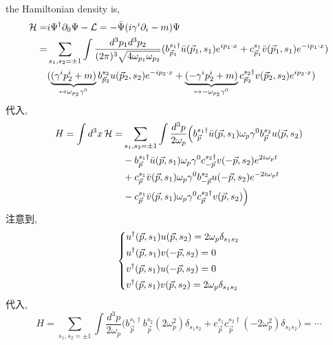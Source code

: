 \begin{itemize}
	\begin{tcolorbox}[title=calculation:]
		the Hamiltonian density is,
		\begin{align}
			\mathcal{H} =& i \Psi^\dag \partial_0 \Psi - \mathcal{L} = - \bar{\Psi} (i \gamma^i \partial_i - m) \Psi \notag \\
			=& \sum_{s_1, s_2 = \pm 1} \int \frac{d^3 p_1 d^3 p_2}{(2 \pi)^3 \sqrt{4 \omega_{p_1} \omega_{p_2}}} (b^{s_1 \dag}_{\vec{p}_1} \bar{u}(\vec{p}_1, s_1) e^{i p_1 \cdot x} + c^{s_1}_{\vec{p}_1} \bar{v}(\vec{p}_1, s_1) e^{- i p_1 \cdot x}) \notag \\
			& (\underbrace{(\gamma^i p_2^i + m)}_{\mapsto \omega_{p_2} \gamma^0} b^{s_2}_{\vec{p}_2} u(\vec{p}_2, s_2) e^{- i p_2 \cdot x} + \underbrace{(- \gamma^i p_2^i + m)}_{\mapsto - \omega_{p_2} \gamma^0} c^{s_2 \dag}_{\vec{p}_2} v(\vec{p}_2, s_2) e^{i p_2 \cdot x})
		\end{align}
		代入,
		\begin{align}
			H = \int d^3 x \, \mathcal{H} =& \sum_{s_1, s_2 = \pm 1} \int \frac{d^3 p}{2 \omega_p} \Big( b^{s_1 \dag}_{\vec{p}} \bar{u}(\vec{p}, s_1) \omega_p \gamma^0 b^{s_2}_{\vec{p}} u(\vec{p}, s_2) \notag \\
			& - b^{s_1 \dag}_{\vec{p}} \bar{u}(\vec{p}, s_1) \omega_p \gamma^0 c^{s_2 \dag}_{- \vec{p}} v(- \vec{p}, s_2) e^{2 i \omega_p t} \notag \\
			& + c^{s_1}_{\vec{p}} \bar{v}(\vec{p}, s_1) \omega_p \gamma^0 b^{s_2}_{- \vec{p}} u(- \vec{p}, s_2) e^{- 2 i \omega_p t} \notag \\
			& - c^{s_1}_{\vec{p}} \bar{v}(\vec{p}, s_1) \omega_p \gamma^0 c^{s_2 \dag}_{\vec{p}} v(\vec{p}, s_2) \Big)
		\end{align}
		注意到,
		\begin{equation}
			\begin{dcases}
				u^\dag(\vec{p}, s_1) u(\vec{p}, s_2) = 2 \omega_p \delta_{s_1 s_2} \\
				u^\dag(\vec{p}, s_1) v(- \vec{p}, s_2) = 0 \\
				v^\dag(\vec{p}, s_1) u(- \vec{p}, s_2) = 0 \\
				v^\dag(\vec{p}, s_1) v(\vec{p}, s_2) = 2 \omega_p \delta_{s_1 s_2}
			\end{dcases}
		\end{equation}
		代入,
		\begin{equation}
			H = \sum_{s_1, s_2 = \pm 1} \int \frac{d^3 p}{2 \omega_p} \Big( b^{s_1 \dag}_{\vec{p}} b^{s_2}_{\vec{p}} (2 \omega_p^2) \delta_{s_1 s_2} + c^{s_1}_{\vec{p}} c^{s_2 \dag}_{\vec{p}} (- 2 \omega_p^2) \delta_{s_1 s_2} \Big) = \cdots
		\end{equation}
	\end{tcolorbox}
\end{itemize}

